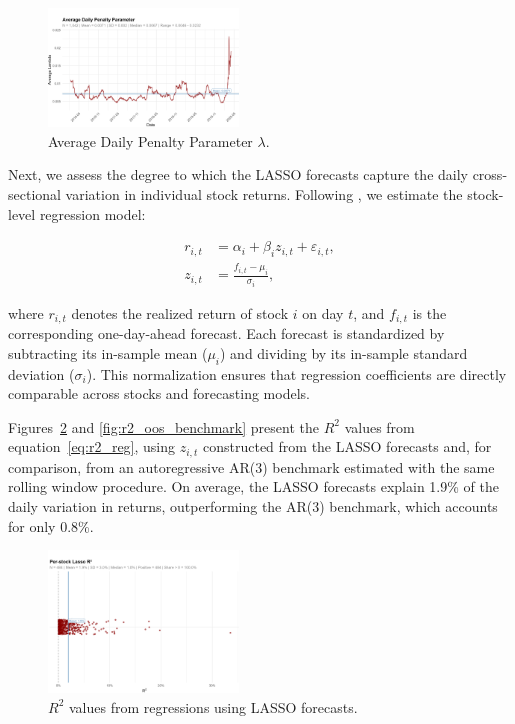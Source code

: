 \documentclass[10pt,twocolumn]{article}
\begin{document}
\begin{figure}[h!] %
    \centering
    \includegraphics[width=0.45\textwidth]{p_daily_lambda.png} 
    \caption{Average Daily Penalty Parameter $\lambda$.}
    \label{fig:lambda_avg} %
\end{figure}

Next, we assess the degree to which the LASSO forecasts capture the daily cross-sectional variation in individual stock returns. Following \cite{chinco2019sparse}, we estimate the stock-level regression model:  

\begin{align}
r_{i,t} &= \alpha_i + \beta_i z_{i,t} + \varepsilon_{i,t}, \label{eq:r2_reg} \\
z_{i,t} &= \frac{f_{i,t} - \mu_i}{\sigma_i}, \label{eq:standardization}
\end{align}

where \( r_{i,t} \) denotes the realized return of stock \( i \) on day \( t \), and \( f_{i,t} \) is the corresponding one-day-ahead forecast. Each forecast is standardized by subtracting its in-sample mean (\(\mu_i\)) and dividing by its in-sample standard deviation (\(\sigma_i\)). This normalization ensures that regression coefficients are directly comparable across stocks and forecasting models.  

Figures~\ref{fig:r2_oos_lasso} and \ref{fig:r2_oos_benchmark} present the \(R^2\) values from equation~\eqref{eq:r2_reg}, using \(z_{i,t}\) constructed from the LASSO forecasts and, for comparison, from an autoregressive AR(3) benchmark estimated with the same rolling window procedure. On average, the LASSO forecasts explain 1.9\% of the daily variation in returns, outperforming the AR(3) benchmark, which accounts for only 0.8\%.  

\begin{figure}[h!]  
    \centering
    \includegraphics[width=0.45\textwidth]{lasso_r2_plot.png} 
    \caption{\(R^2\) values from regressions using LASSO forecasts.}
    \label{fig:r2_oos_lasso}  
\end{figure}
\end{document}
